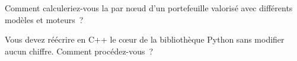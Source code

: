 \begin{interviewq}\label{iq:dv:build-a-pricing-library:5}
Comment calculeriez-vous la  par nœud d'un portefeuille valorisé avec différents modèles et moteurs~?
\end{interviewq}

\begin{interviewq}\label{iq:dv:build-a-pricing-library:6}
Vous devez réécrire en C++ le cœur de la bibliothèque Python sans modifier aucun chiffre. Comment procédez-vous~?
\end{interviewq}
